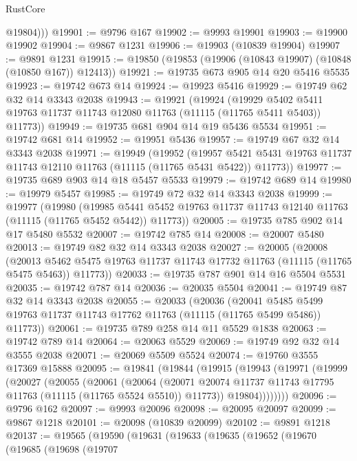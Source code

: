 \begin{lexlean}{RustCore}
\begin{coremodule}
          @19804)))
@19901 := @9796 @167
@19902 := @9993 @19901
@19903 := @19900 @19902
@19904 := @9867 @1231
@19906 := @19903 (@10839 @19904)
@19907 := @9891 @1231
@19915 := @19850 (@19853 (@19906 (@10843 @19907) (@10848 (@10850 @167)) @12413))
@19921 := @19735 @673 @905 @14 @20 @5416 @5535
@19923 := @19742 @673 @14
@19924 := @19923 @5416
@19929 := @19749 @62 @32 @14 @3343 @2038
@19943 := @19921
    (@19924
      (@19929 @5402 @5411 @19763 @11737 @11743 @12080 @11763 (@11115 (@11765 @5411 @5403)) @11773))
@19949 := @19735 @681 @904 @14 @19 @5436 @5534
@19951 := @19742 @681 @14
@19952 := @19951 @5436
@19957 := @19749 @67 @32 @14 @3343 @2038
@19971 := @19949
    (@19952
      (@19957 @5421 @5431 @19763 @11737 @11743 @12110 @11763 (@11115 (@11765 @5431 @5422)) @11773))
@19977 := @19735 @689 @903 @14 @18 @5457 @5533
@19979 := @19742 @689 @14
@19980 := @19979 @5457
@19985 := @19749 @72 @32 @14 @3343 @2038
@19999 := @19977
    (@19980
      (@19985 @5441 @5452 @19763 @11737 @11743 @12140 @11763 (@11115 (@11765 @5452 @5442)) @11773))
@20005 := @19735 @785 @902 @14 @17 @5480 @5532
@20007 := @19742 @785 @14
@20008 := @20007 @5480
@20013 := @19749 @82 @32 @14 @3343 @2038
@20027 := @20005
    (@20008
      (@20013 @5462 @5475 @19763 @11737 @11743 @17732 @11763 (@11115 (@11765 @5475 @5463)) @11773))
@20033 := @19735 @787 @901 @14 @16 @5504 @5531
@20035 := @19742 @787 @14
@20036 := @20035 @5504
@20041 := @19749 @87 @32 @14 @3343 @2038
@20055 := @20033
    (@20036
      (@20041 @5485 @5499 @19763 @11737 @11743 @17762 @11763 (@11115 (@11765 @5499 @5486)) @11773))
@20061 := @19735 @789 @258 @14 @11 @5529 @1838
@20063 := @19742 @789 @14
@20064 := @20063 @5529
@20069 := @19749 @92 @32 @14 @3555 @2038
@20071 := @20069 @5509 @5524
@20074 := @19760 @3555 @17369 @15888
@20095 := @19841
    (@19844
      (@19915
        (@19943
          (@19971
            (@19999
              (@20027
                (@20055
                  (@20061
                    (@20064
                      (@20071
                        @20074
                        @11737
                        @11743
                        @17795
                        @11763
                        (@11115 (@11765 @5524 @5510))
                        @11773))
                    @19804))))))))
@20096 := @9796 @162
@20097 := @9993 @20096
@20098 := @20095 @20097
@20099 := @9867 @1218
@20101 := @20098 (@10839 @20099)
@20102 := @9891 @1218
@20137 := @19565
    (@19590
      (@19631
        (@19633
          (@19635
            (@19652
              (@19670
                (@19685
                  (@19698
                    (@19707

\end{coremodule}
\end{lexlean}
